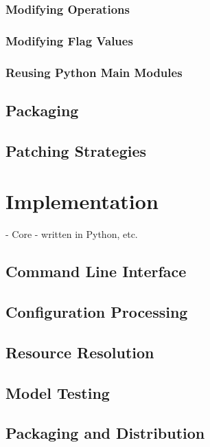 \documentclass{article}
\begin{document}
\subsubsection{Modifying Operations}

\subsubsection{Modifying Flag Values}

\subsubsection{Reusing Python Main Modules}

\subsection{Packaging}

\subsection{Patching Strategies}

\section{Implementation}

- Core - written in Python, etc.

\subsection{Command Line Interface}

\subsection{Configuration Processing}

\subsection{Resource Resolution}

\subsection{Model Testing}

\subsection{Packaging and Distribution}
\end{document}
